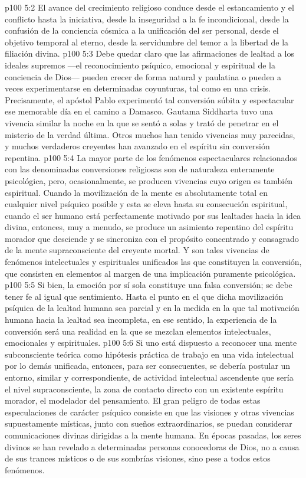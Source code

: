 \vs p100 5:2 El avance del crecimiento religioso conduce desde el estancamiento y el conflicto hasta la iniciativa, desde la inseguridad a la fe incondicional, desde la confusión de la conciencia cósmica a la unificación del ser personal, desde el objetivo temporal al eterno, desde la servidumbre del temor a la libertad de la filiación divina.
\vs p100 5:3 \pc Debe quedar claro que las afirmaciones de lealtad a los ideales supremos ---el reconocimiento psíquico, emocional y espiritual de la conciencia de Dios--- pueden crecer de forma natural y paulatina o pueden a veces experimentarse en determinadas coyunturas, tal como en una crisis. Precisamente, el apóstol Pablo experimentó tal conversión súbita y espectacular ese memorable día en el camino a Damasco. Gautama Siddharta tuvo una vivencia similar la noche en la que se sentó a solas y trató de penetrar en el misterio de la verdad última. Otros muchos han tenido vivencias muy parecidas, y muchos verdaderos creyentes han avanzado en el espíritu sin conversión repentina.
\vs p100 5:4 La mayor parte de los fenómenos espectaculares relacionados con las denominadas conversiones religiosas son de naturaleza enteramente psicológica, pero, ocasionalmente, se producen vivencias cuyo origen es también espiritual. Cuando la movilización de la mente es absolutamente total en cualquier nivel psíquico posible y esta se eleva hasta su consecución espiritual, cuando el ser humano está perfectamente motivado por sus lealtades hacia la idea divina, entonces, muy a menudo, se produce un asimiento repentino del espíritu morador que desciende y se sincroniza con el propósito concentrado y consagrado de la mente supraconsciente del creyente mortal. Y son tales vivencias de fenómenos intelectuales y espirituales unificados las que constituyen la conversión, que consisten en elementos al margen de una implicación puramente psicológica.
\vs p100 5:5 Si bien, la emoción por sí sola constituye una falsa conversión; se debe tener fe al igual que sentimiento. Hasta el punto en el que dicha movilización psíquica de la lealtad humana sea parcial y en la medida en la que tal motivación humana hacia la lealtad sea incompleta, en ese sentido, la experiencia de la conversión será una realidad en la que se mezclan elementos intelectuales, emocionales y espirituales.
\vs p100 5:6 \pc Si uno está dispuesto a reconocer una mente subconsciente teórica como hipótesis práctica de trabajo en una vida intelectual por lo demás unificada, entonces, para ser consecuentes, se debería postular un entorno, similar y correspondiente, de actividad intelectual ascendente que sería el nivel supraconsciente, la zona de contacto directo con un existente espíritu morador, el modelador del pensamiento. El gran peligro de todas estas especulaciones de carácter psíquico consiste en que las visiones y otras vivencias supuestamente místicas, junto con sueños extraordinarios, se puedan considerar comunicaciones divinas dirigidas a la mente humana. En épocas pasadas, los seres divinos se han revelado a determinadas personas conocedoras de Dios, no a causa de sus trances místicos o de sus sombrías visiones, sino pese a todos estos fenómenos.
